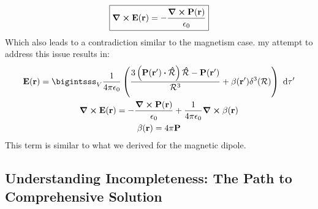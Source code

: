 \documentclass{article}
\numberwithin{equation}{section}
\begin{document}
\begin{equation}
\label{eqn:eq39}
\boxed{\curl\vb{E}(\vb{r})=-\frac{\curl\vb{P}(\vb{r})}{\epsilon_0}}
\end{equation}
Which also leads to a contradiction similar to the magnetism case. my attempt to address this issue results in:
\begin{gather}
\vb{E}(\vb{r})=\bigintsss_V \frac{1}{4\pi\epsilon_0}\left( \frac{3\left(\vb{P}(\vb{r'})\vdot\vu{\mathcal{R}}\right)\vu{\mathcal{R}}-\vb{P}(\vb{r'})}{\mathcal{R}^3}+\vb{\beta}(\vb{r'})\delta^3(\vb{\mathcal{R}})\right)\ \dd\tau'\nonumber\\\curl\vb{E}(\vb{r})=-\frac{\curl\vb{P}(\vb{r})}{\epsilon_0}+\frac{1}{4\pi\epsilon_0}\curl\vb{\beta}(\vb{r})\nonumber\\\vb{\beta}(\vb{r})=4\pi\vb{P}\label{eqn:eq40}
\end{gather}
This term is similar to what we derived for the magnetic dipole.


\subsection{Understanding Incompleteness: The Path to Comprehensive Solution}
\end{document}
